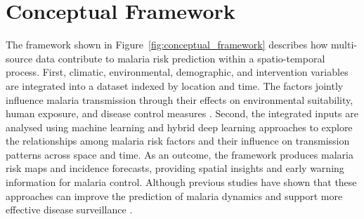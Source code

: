 \section{Conceptual Framework}
	The  framework shown in Figure~\ref{fig:conceptual_framework} describes how multi-source data contribute to malaria risk prediction within a spatio-temporal process. First, climatic, environmental, demographic, and intervention variables are integrated into a dataset indexed by location and time. The factors jointly influence malaria transmission through their effects on environmental suitability, human exposure, and disease control measures \cite{Caminade2023}. Second, the integrated inputs are analysed using machine learning and hybrid deep learning approaches to explore the relationships among malaria risk factors and their influence on transmission patterns across space and time. As an outcome, the framework produces malaria risk maps and incidence forecasts, providing spatial insights and early warning information for malaria control. Although previous studies have shown that these approaches can improve the prediction of malaria dynamics and support more effective disease surveillance \cite{Egbuna2025}. 
